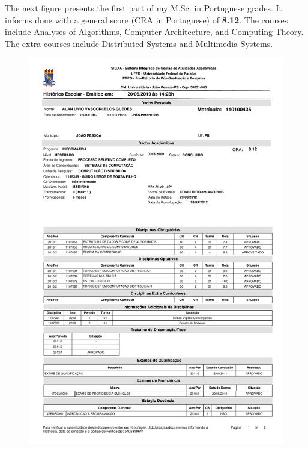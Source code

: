 \documentclass[10pt,a4paper,sans,colorlinks]{moderncv}
\begin{document}
\newpage
The next figure presents the first part of my M.Sc. in Portuguese grades.
It informs done with a general score (CRA in Portuguese) of \textbf{8.12}.
The courses include Analyses of Algorithms, Computer Architecture, and Computing Theory.
The extra courses include Distributed Systems and Multimedia Systems.
\vspace{1em}
\begin{figure}
    \centering
    \includegraphics[align=t,width=\textwidth,height=0.6\paperheight, keepaspectratio=true, trim=0cm 0cm 0cm 2cm]{certificates/msc-grades.pdf}
\end{figure}
\end{document}
